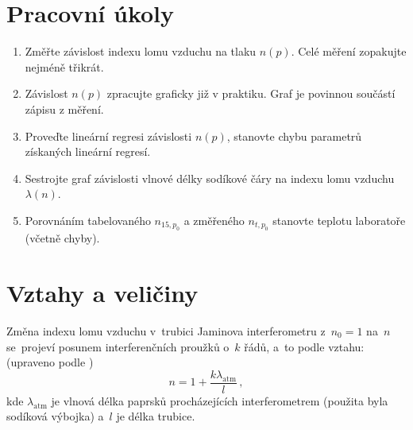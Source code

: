 \documentclass{../concepts/titul_zprava_p/prepareprotokolZprava} %
\begin{document}
\renewcommand{\figurename}{Graf}
\renewcommand{\refname}{Literatura}
\renewcommand{\today}{\number\day.\,\number\month.\,\number\year}

\graphicspath{{../concepts/titul_protokol_p/}}
\maketitle

\section{Pracovní úkoly}
\begin{enumerate}
    \item Změřte závislost indexu lomu vzduchu na tlaku $n(p)$. Celé měření zopakujte nejméně třikrát.
    \item Závislost $n(p)$ zpracujte graficky již v praktiku. Graf je povinnou součástí zápisu z měření.
    \item Proveďte lineární regresi závislosti $n(p)$, stanovte chybu parametrů získaných lineární regresí.
    \item Sestrojte graf závislosti vlnové délky sodíkové čáry na indexu lomu vzduchu $\lambda(n)$.
    \item Porovnáním tabelovaného $n_{15,p_0}$ a změřeného $n_{t,p_0}$ stanovte teplotu laboratoře (včetně chyby).
\end{enumerate}

\section{Vztahy a veličiny}


Změna indexu lomu vzduchu v~trubici Jaminova interferometru z~$n_0=1$ na~$n$ se~projeví posunem interferenčních proužků 
o~$k$ řádů, a~to podle vztahu: (upraveno podle \cite{pokyny})
\begin{equation}
    \label{eq:index_na_k}
    n = 1 + \frac{k \lambda_{\mathrm{atm}}}{l} \,,
\end{equation}
kde $\lambda_{\mathrm{atm}}$ je vlnová délka paprsků procházejících interferometrem (použita byla sodíková výbojka)
a~$l$ je délka trubice.
\end{document}

